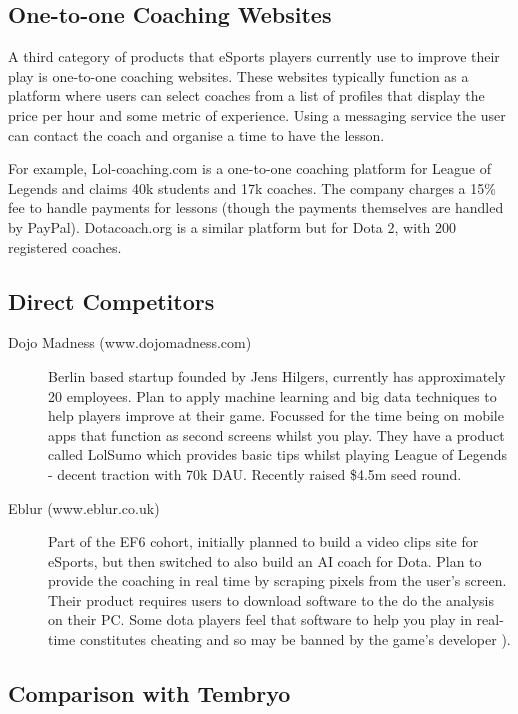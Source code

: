 \documentclass[12pt]{article} %
\begin{document}
\subsection{One-to-one Coaching Websites }
 
A third category of products that eSports players currently use to improve their play is one-to-one coaching websites. These websites typically function as a platform where users can select coaches from a list of profiles that display the price per hour and some metric of experience. Using a messaging service the user can contact the coach and organise a time to have the lesson.
 
For example, Lol-coaching.com is a one-to-one coaching platform for League of Legends and claims 40k students and 17k coaches. The company charges a 15\% fee to handle payments for lessons (though the payments themselves are handled by PayPal). Dotacoach.org is a similar platform but for Dota 2, with 200 registered coaches.

\subsection{Direct Competitors}

\begin{description}
 \item [Dojo Madness (www.dojomadness.com)] Berlin based startup founded by Jens Hilgers, currently has approximately 20 employees. Plan to apply machine learning and big data techniques to help players improve at their game. Focussed for the time being on mobile apps that function as second screens whilst you play. They have a product called LolSumo which provides basic tips whilst playing League of Legends - decent traction with 70k DAU. Recently raised \$4.5m seed round.

 \item [Eblur (www.eblur.co.uk)] Part of the EF6 cohort, initially planned to build a video clips site for eSports, but then switched to also build an AI coach for Dota. Plan to provide the coaching in real time by scraping pixels from the user's screen. Their product requires users to download software to the do the analysis on their PC. Some dota players feel that software to help you play in real-time constitutes cheating and so may be banned by the game's developer \cite{Eblur}).
\end{description}

\subsection{Comparison with Tembryo}
 
\end{document}
